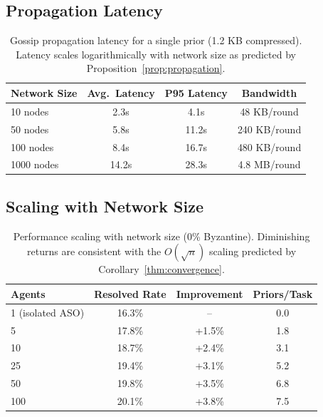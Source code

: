 \subsection{Propagation Latency}

\begin{table}[h]
\centering
\begin{tabular}{lccc}
\toprule
Network Size & Avg.\ Latency & P95 Latency & Bandwidth \\
\midrule
10 nodes & 2.3s & 4.1s & 48 KB/round \\
50 nodes & 5.8s & 11.2s & 240 KB/round \\
100 nodes & 8.4s & 16.7s & 480 KB/round \\
1000 nodes & 14.2s & 28.3s & 4.8 MB/round \\
\bottomrule
\end{tabular}
\caption{Gossip propagation latency for a single prior (1.2 KB compressed).
Latency scales logarithmically with network size as predicted by
Proposition~\ref{prop:propagation}.}
\label{tab:latency}
\end{table}

\subsection{Scaling with Network Size}

\begin{table}[h]
\centering
\begin{tabular}{lccc}
\toprule
Agents & Resolved Rate & Improvement & Priors/Task \\
\midrule
1 (isolated ASO) & 16.3\% & -- & 0.0 \\
5 & 17.8\% & +1.5\% & 1.8 \\
10 & 18.7\% & +2.4\% & 3.1 \\
25 & 19.4\% & +3.1\% & 5.2 \\
50 & 19.8\% & +3.5\% & 6.8 \\
100 & 20.1\% & +3.8\% & 7.5 \\
\bottomrule
\end{tabular}
\caption{Performance scaling with network size (0\% Byzantine). Diminishing
returns are consistent with the $O(\sqrt{n})$ scaling predicted by
Corollary~\ref{thm:convergence}.}
\label{tab:scaling}
\end{table}


